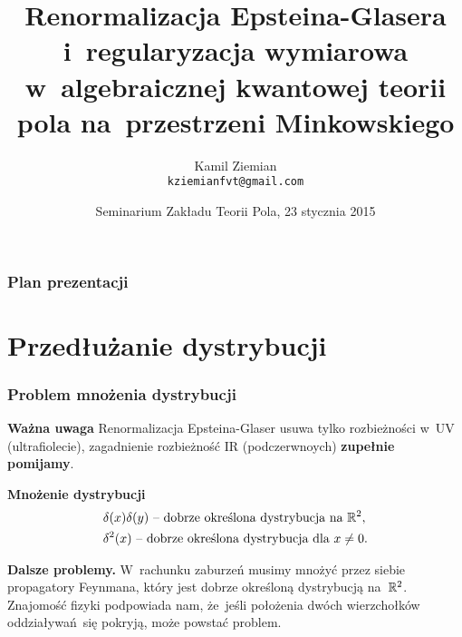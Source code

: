 \documentclass[10pt,t]{beamer}
\title{Renormalizacja Epsteina-Glasera i~regularyzacja
  wymiarowa w~algebraicznej kwantowej teorii pola na~przestrzeni
  Minkowskiego}
\author{Kamil Ziemian \\
  \texttt{kziemianfvt@gmail.com}}
\institute{Uniwersytet Jagielloński w~Krakowie}
\date[23 I 2015]{Seminarium Zakładu Teorii Pola, 23 stycznia 2015}
\begin{document}






\RaggedRight





\maketitle %





\begin{frame}
  \frametitle{Plan prezentacji}


  \tableofcontents %

\end{frame}










\section{Przedłużanie dystrybucji}



\begin{frame}
  \frametitle{Problem mnożenia dystrybucji}


  \textbf{Ważna uwaga}
  Renormalizacja Epsteina-Glaser usuwa tylko rozbieżności w~UV
  (ultrafiolecie), zagadnienie rozbieżność IR (podczerwnoych)
  \textbf{zupełnie pomijamy}.

  \vspace{\spaceFour}



  \textbf{Mnożenie dystrybucji}
  \begin{align}
    \label{eq:Remornalizacja-E-G-01-A}
    &\delta( x ) \delta( y ) \textrm{ -- dobrze określona dystrybucja na }
      \mathbb{R}^{ 2 }, \\
    \label{eq:Remornalizacja-E-G-01-B}
    &\delta^{ 2 }( x ) \textrm{ -- dobrze określona dystrybucja dla }
      x \neq 0.
  \end{align}

  \vspace{\spaceFour}



  \textbf{Dalsze problemy.}
  W~rachunku zaburzeń musimy mnożyć przez siebie propagatory Feynmana,
  który jest dobrze określoną dystrybucją na~$\mathbb{R}^{ 2 }$. Znajomość fizyki
  podpowiada nam, że~jeśli położenia dwóch wierzchołków
  oddziaływań~się pokryją, może powstać problem.

\end{frame}
\end{document}
